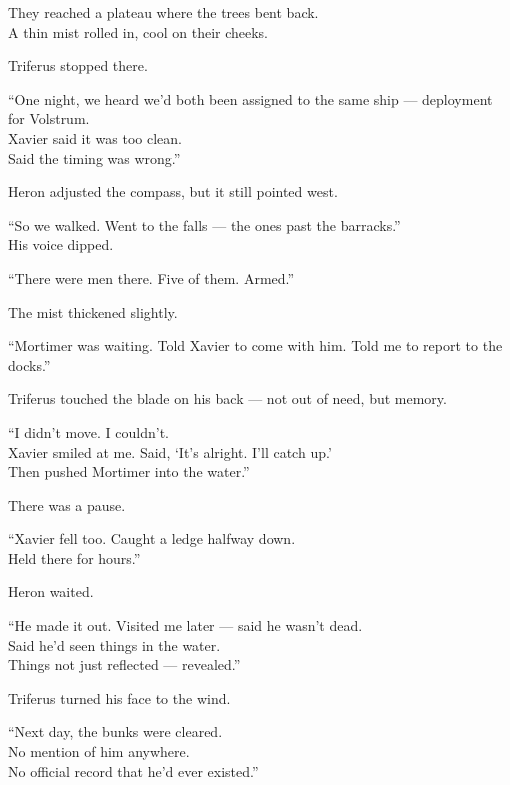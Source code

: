 \documentclass[9pt]{article}
\begin{document}
\vspace{1em}

They reached a plateau where the trees bent back.\\
A thin mist rolled in, cool on their cheeks.

Triferus stopped there.

“One night, we heard we’d both been assigned to the same ship — deployment for Volstrum.\\
Xavier said it was too clean.\\
Said the timing was wrong.”

Heron adjusted the compass, but it still pointed west.

“So we walked. Went to the falls — the ones past the barracks.”\\
His voice dipped.

“There were men there. Five of them. Armed.”

\vspace{1em}

The mist thickened slightly.

“Mortimer was waiting. Told Xavier to come with him. Told me to report to the docks.”

Triferus touched the blade on his back — not out of need, but memory.

“I didn’t move. I couldn’t.\\
Xavier smiled at me. Said, ‘It’s alright. I’ll catch up.’\\
Then pushed Mortimer into the water.”

\vspace{1em}

There was a pause.

“Xavier fell too. Caught a ledge halfway down.\\
Held there for hours.”

Heron waited.

“He made it out. Visited me later — said he wasn’t dead.\\
Said he’d seen things in the water.\\
Things not just reflected — revealed.”

\vspace{1em}

Triferus turned his face to the wind.

“Next day, the bunks were cleared.\\
No mention of him anywhere.\\
No official record that he’d ever existed.”
\end{document}
